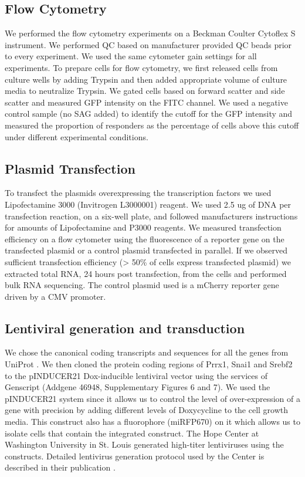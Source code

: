 \subsection{Flow Cytometry}
We performed the flow cytometry experiments on a Beckman Coulter Cytoflex S instrument. We performed QC based on manufacturer provided QC beads prior to every experiment. We used the same cytometer gain settings for all experiments. To prepare cells for flow cytometry, we first released cells from culture wells by adding Trypsin and then added appropriate volume of culture media to neutralize Trypsin. We gated cells based on forward scatter and side scatter and measured GFP intensity on the FITC channel. We used a negative control sample (no SAG added) to identify the cutoff for the GFP intensity and measured the proportion of responders as the percentage of cells above this cutoff under different experimental conditions.

\subsection{Plasmid Transfection}
To transfect the plasmids overexpressing the transcription factors we used Lipofectamine 3000 (Invitrogen L3000001) reagent. We used 2.5 ug of DNA per transfection reaction, on a six-well plate, and followed manufacturers instructions for amounts of Lipofectamine and P3000 reagents. We measured transfection efficiency on a flow cytometer using the fluorescence of a reporter gene on the transfected plasmid or a control plasmid transfected in parallel. If we observed sufficient transfection efficiency (> 50\% of cells express transfected plasmid) we extracted total RNA, 24 hours post transfection, from the cells and performed bulk RNA sequencing. The control plasmid used is a mCherry reporter gene driven by a CMV promoter.

\subsection{Lentiviral generation and transduction}
We chose the canonical coding transcripts and sequences for all the genes from UniProt \cite{noauthor_2021-be}. We then cloned the protein coding regions of Prrx1, Snai1 and Srebf2 to the pINDUCER21 Dox-inducible lentiviral vector \cite{Meerbrey2011-ew} using the services of Genscript (Addgene 46948, Supplementary Figures 6 and 7). We used the pINDUCER21 system since it allows us to control the level of over-expression of a gene with precision by adding different levels of Doxycycline to the cell growth media. This construct also has a fluorophore (miRFP670) on it which allows us to isolate cells that contain the integrated construct. The Hope Center at Washington University in St. Louis generated high-titer lentiviruses using the constructs. Detailed lentivirus generation protocol used by the Center is described in their publication \cite{Li2012-if}.

